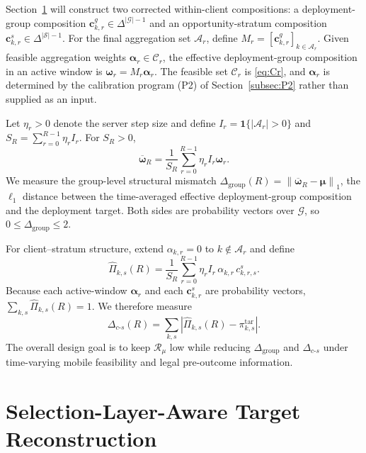\documentclass[letterpaper,journal]{IEEEtran}
\begin{document}
Section~\ref{sec:reconstruction} will construct two corrected within-client
compositions: a deployment-group composition
$\mathbf{c}^{g}_{k,r}\in\Delta^{|\mathcal{G}|-1}$ and an opportunity-stratum
composition $\mathbf{c}^{s}_{k,r}\in\Delta^{|\mathcal{S}|-1}$.  For the final
aggregation set $\mathcal{A}_r$, define
$M_r=[\mathbf{c}^{g}_{k,r}]_{k\in\mathcal{A}_r}$.
Given feasible aggregation weights $\boldsymbol\alpha_r\in\mathcal{C}_r$, the
effective deployment-group composition in an active window is
$\boldsymbol\omega_r=M_r\boldsymbol\alpha_r$.  The feasible set
$\mathcal{C}_r$ is \eqref{eq:Cr}, and $\boldsymbol\alpha_r$ is determined by the
calibration program (P2) of Section~\ref{subsec:P2} rather than supplied as an
input.

Let $\eta_r>0$ denote the server step size and define
$I_r=\mathbf{1}\{|\mathcal{A}_r|>0\}$ and
$S_R=\sum_{r=0}^{R-1}\eta_r I_r$.
For $S_R>0$,
\begin{equation}
    \overline{\boldsymbol\omega}_R
    =
    \frac{1}{S_R}
    \sum_{r=0}^{R-1}
    \eta_r I_r\boldsymbol\omega_r.
    \label{eq:omega_bar}
\end{equation}
We measure the group-level structural mismatch
$\Delta_{\mathrm{group}}(R)=\left\|
\overline{\boldsymbol\omega}_R-\boldsymbol\mu
\right\|_1$,
the $\ell_1$ distance between the time-averaged effective deployment-group
composition and the deployment target.  Both sides are probability vectors
over $\mathcal{G}$, so $0\le\Delta_{\mathrm{group}}\le2$.

For client--stratum structure, extend $\alpha_{k,r}=0$ to
$k\notin\mathcal{A}_r$ and define
\begin{equation}
 \widehat\Pi_{k,s}(R)
 =
 \frac{1}{S_R}
 \sum_{r=0}^{R-1}
 \eta_r I_r\,
 \alpha_{k,r}\,
 c^{s}_{k,r,s}.
 \label{eq:Pi_hat_ks}
\end{equation}
Because each active-window $\boldsymbol\alpha_r$ and each
$\mathbf{c}^{s}_{k,r}$ are probability vectors,
$\sum_{k,s}\widehat\Pi_{k,s}(R)=1$.  We therefore measure
\begin{equation}
 \Delta_{c\text{-}s}(R)
 =
 \sum_{k,s}
 \left|
 \widehat\Pi_{k,s}(R)-\pi^{\mathrm{tar}}_{k,s}
 \right|.
 \label{eq:delta_cs}
\end{equation}
The overall design goal is to keep $\mathcal{R}_{\mu}$ low while
reducing $\Delta_{\mathrm{group}}$ and $\Delta_{c\text{-}s}$ under
time-varying mobile feasibility and legal pre-outcome information.


\section{Selection-Layer-Aware Target Reconstruction}
\label{sec:reconstruction}
\end{document}
